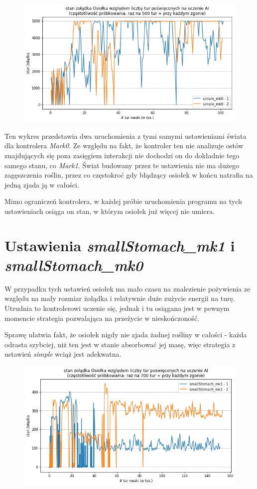 \begin{figure}[H]
    \centering
    \includegraphics[scale=0.6]{Chapters/simple_mk0_hunger}
\end{figure}

Ten wykres przedstawia dwa uruchomienia z tymi samymi ustawieniami świata dla kontrolera \textit{Mark0}. Ze względu na fakt, że kontroler ten nie analizuje ostów znajdujących się poza zasięgiem interakcji nie dochodzi on do dokładnie tego samego stanu, co \textit{Mark1}. Świat budowany przez te ustawienia nie ma dużego zagęszczenia roślin, przez co częstokroć gdy błądzący osiołek w końcu natrafia na jedną zjada ją w całości.

Mimo ograniczeń kontrolera, w każdej próbie uruchomienia programu na tych ustawieniach osiąga on stan, w którym osiołek już więcej nie umiera.

\section{Ustawienia \textit{smallStomach\_mk1} i \textit{smallStomach\_mk0}}
W przypadku tych  ustawień osiołek ma mało czasu na znalezienie pożywienia ze względu na mały rozmiar żołądka i relatywnie duże zużycie energii na turę. Utrudnia to kontrolerowi uczenie się, jednak i tu osiągana jest w pewnym momencie strategia pozwalająca na przeżycie w nieskończoność.

Sprawę ułatwia fakt, że osiołek nigdy nie zjada żadnej rośliny w całości - każda odrasta szybciej, niż ten jest w stanie absorbować jej masę, więc strategia z ustawień \textit{simple} wciąż jest adekwatna.

\begin{figure}[H]
    \centering
    \includegraphics[scale=0.6]{Chapters/smallStomach_mk1_hunger}
\end{figure}

